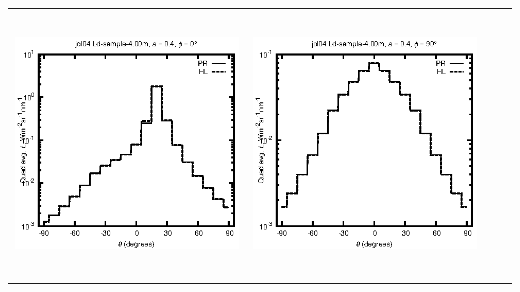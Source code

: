 \begin{tabular}{c c c c}
\includegraphics[height=7cm]{../eps/jol04_Ld_sample_4.00m_fwd.eps} &
\includegraphics[height=7cm]{../eps/jol04_Ld_sample_4.00m_cross.eps} \\
\end{tabular}

\pagebreak

